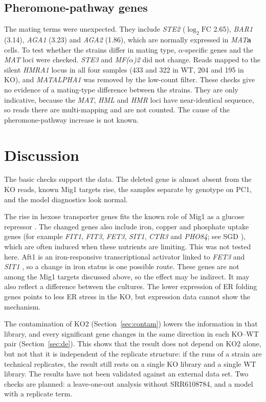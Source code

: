 \documentclass[11pt, a4paper]{article}
\newcommand{\gene}[1]{\textit{#1}}
\begin{document}
\subsection{Pheromone-pathway genes}
The mating terms were unexpected. They include \gene{STE2} ($\log_2\mathrm{FC}$ 2.65), \gene{BAR1} (3.14), \gene{AGA1} (3.23) and \gene{AGA2} (1.86), which are normally expressed in \textit{MAT}\textbf{a} cells. To test whether the strains differ in mating type, $\alpha$-specific genes and the \textit{MAT} loci were checked. \gene{STE3} and \gene{MF($\alpha$)2} did not change. Reads mapped to the silent \gene{HMRA1} locus in all four samples (433 and 322 in WT, 204 and 195 in KO), and \gene{MATALPHA1} was removed by the low-count filter. These checks give no evidence of a mating-type difference between the strains. They are only indicative, because the \textit{MAT}, \textit{HML} and \textit{HMR} loci have near-identical sequence, so reads there are multi-mapping and are not counted. The cause of the pheromone-pathway increase is not known.

\section{Discussion}
The basic checks support the data. The deleted gene is almost absent from the KO reads, known Mig1 targets rise, the samples separate by genotype on PC1, and the model diagnostics look normal.

The rise in hexose transporter genes fits the known role of Mig1 as a glucose repressor \cite{nehlin1990,gancedo1998}. The changed genes also include iron, copper and phosphate uptake genes (for example \gene{FIT1}, \gene{FIT3}, \gene{FET3}, \gene{SIT1}, \gene{CTR3} and \gene{PHO84}; see SGD \cite{cherry2012}), which are often induced when these nutrients are limiting. This was not tested here. Aft1 is an iron-responsive transcriptional activator linked to \gene{FET3} and \gene{SIT1} \cite{ueta2012}, so a change in iron status is one possible route. These genes are not among the Mig1 targets discussed above, so the effect may be indirect. It may also reflect a difference between the cultures. The lower expression of ER folding genes points to less ER stress in the KO, but expression data cannot show the mechanism.

The contamination of KO2 (Section~\ref{sec:contam}) lowers the information in that library, and every significant gene changes in the same direction in each KO--WT pair (Section~\ref{sec:de}). This shows that the result does not depend on KO2 alone, but not that it is independent of the replicate structure: if the runs of a strain are technical replicates, the result still rests on a single KO library and a single WT library. The results have not been validated against an external data set. Two checks are planned: a leave-one-out analysis without SRR6108784, and a model with a replicate term.
\end{document}

